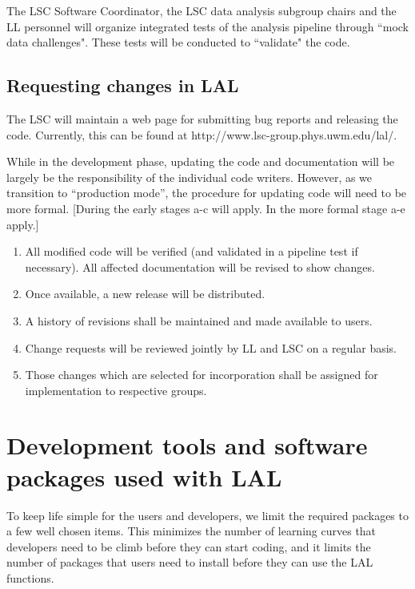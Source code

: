 \documentclass[]{ligodcc}
\begin{document}
The LSC Software Coordinator, the LSC data analysis subgroup chairs
and the LL personnel will  organize  integrated tests of the analysis
pipeline  through ``mock data challenges". These tests will be
conducted to ``validate" the code.

\subsection{Requesting changes in LAL}

The LSC will maintain a web page for submitting bug reports and
releasing  the code. Currently, this can be found at
http://www.lsc-group.phys.uwm.edu/lal/.

While in the development phase, updating the code and documentation
will be largely be the responsibility of the individual code writers.
However, as we transition to ``production mode'', the procedure for
updating code will need to  be more formal.  [During the early stages
a-c will apply.  In the more formal stage a-e apply.]

\renewcommand{\labelenumi}{\alph{enumi}.}
\begin{enumerate}
\item
All modified code  will be verified (and validated in a
pipeline test if necessary). All affected documentation will be
revised to show changes.
\item
Once available, a new release will be distributed.
\item
A history of revisions shall be maintained and made available to users.
\item
Change requests will be reviewed jointly by LL and LSC on a regular basis.
\item
Those changes which are selected for incorporation shall be
assigned for implementation to respective groups.
\end{enumerate}
\renewcommand{\labelenumi}{\alph{arabic}.}


\section{Development tools and software packages used with LAL}
\label{sec:laltools}

To keep life simple for the users and developers, we limit the
required packages to a few well chosen items. This minimizes the
number of learning curves that developers need to be climb before they
can start coding, and it limits the number of packages that users need
to install before they can use the LAL functions.
\end{document}
